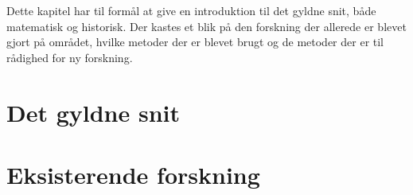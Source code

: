 \textsf{
Dette kapitel har til formål at give en introduktion til det gyldne snit,
både matematisk og historisk. Der kastes et blik på den forskning der
allerede er blevet gjort på området, hvilke metoder der er blevet brugt
og de metoder der er til rådighed for ny forskning.
}

\section{Det gyldne snit\label{section_gyldne_snit}}


\section{Eksisterende forskning\label{section_forskning}}


